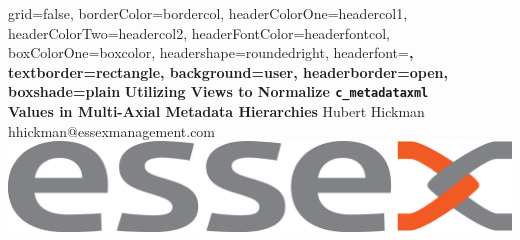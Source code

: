 \documentclass[a0paper,portrait]{baposter}
\begin{document}
\begin{poster}{
grid=false,
borderColor=bordercol, %
headerColorOne=headercol1, %
headerColorTwo=headercol2, %
headerFontColor=headerfontcol, %
boxColorOne=boxcolor, %
headershape=roundedright, %
headerfont=\Large\sf\bf, %
textborder=rectangle,
background=user,
headerborder=open, %
boxshade=plain
}
{}
%
%
{\sf\bf \LARGE{Utilizing Views to Normalize  \texttt{c\_metadataxml} \\ Values in Multi-Axial Metadata Hierarchies}} %
{\vspace{1em} Hubert Hickman\\ %
{\smaller hhickman@essexmanagement.com}} %
{\includegraphics[scale=0.12]{essex}} %





\end{poster}
\end{document}
